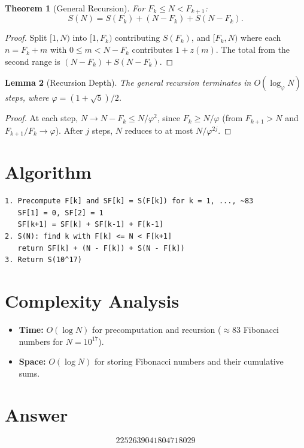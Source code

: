 \documentclass[12pt]{article}
\newtheorem{theorem}{Theorem}
\newtheorem{lemma}[theorem]{Lemma}
\begin{document}
\begin{theorem}[General Recursion]
For $F_k \leq N < F_{k+1}$:
\[
S(N) = S(F_k) + (N - F_k) + S(N - F_k).
\]
\end{theorem}

\begin{proof}
Split $[1, N)$ into $[1, F_k)$ contributing $S(F_k)$, and $[F_k, N)$ where each $n = F_k + m$ with $0 \leq m < N - F_k$ contributes $1 + z(m)$. The total from the second range is $(N - F_k) + S(N - F_k)$.
\end{proof}

\begin{lemma}[Recursion Depth]
The general recursion terminates in $O(\log_\varphi N)$ steps, where $\varphi = (1+\sqrt{5})/2$.
\end{lemma}

\begin{proof}
At each step, $N \to N - F_k \leq N/\varphi^2$, since $F_k \geq N/\varphi$ (from $F_{k+1} > N$ and $F_{k+1}/F_k \to \varphi$). After $j$ steps, $N$ reduces to at most $N/\varphi^{2j}$.
\end{proof}

\section{Algorithm}

\begin{verbatim}
1. Precompute F[k] and SF[k] = S(F[k]) for k = 1, ..., ~83
   SF[1] = 0, SF[2] = 1
   SF[k+1] = SF[k] + SF[k-1] + F[k-1]
2. S(N): find k with F[k] <= N < F[k+1]
   return SF[k] + (N - F[k]) + S(N - F[k])
3. Return S(10^17)
\end{verbatim}

\section{Complexity Analysis}
\begin{itemize}
\item \textbf{Time:} $O(\log N)$ for precomputation and recursion ($\approx 83$ Fibonacci numbers for $N = 10^{17}$).
\item \textbf{Space:} $O(\log N)$ for storing Fibonacci numbers and their cumulative sums.
\end{itemize}

\section{Answer}

\[
\boxed{2252639041804718029}
\]
\end{document}
